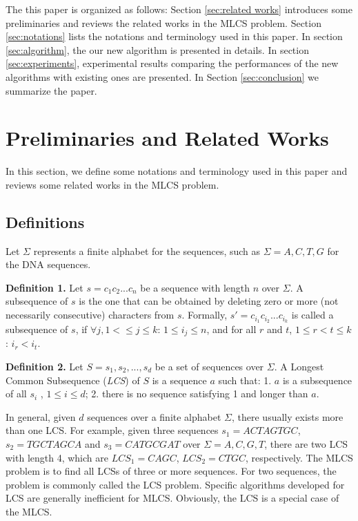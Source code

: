 \documentclass{article}
\begin{document}
The this paper is organized as follows: Section \ref{sec:related
  works} introduces some preliminaries and reviews the related works
in the MLCS problem. Section \ref{sec:notations} lists the notations
and terminology used in this paper. In section \ref{sec:algorithm},
the our new algorithm is presented in details. In section
\ref{sec:experiments}, experimental results comparing the performances
of the new algorithms with existing ones are presented. In Section
\ref{sec:conclusion} we summarize the paper.

\section{Preliminaries and Related Works}
\label{sec:related works}

In this section, we define some notations and terminology used in this
paper and reviews some related works in the MLCS problem.

\subsection{Definitions}
\label{sec:definitions}

Let $\Sigma$ represents a finite alphabet for the sequences, such as
$\Sigma={A, C, T, G}$ for the DNA sequences.

\textbf{Definition 1.} Let $s=c_1c_2...c_n$ be a sequence with length
$n$ over $\Sigma$. A subsequence of $s$ is the one that can be
obtained by deleting zero or more (not necessarily consecutive)
characters from $s$. Formally, $s'=c_{i_1}c_{i_2}...c_{i_k}$ is called
a subsequence of $s$, if $\forall j, 1< \leq j \leq k$:
$1 \leq i_j \leq n$, and for all $r$ and $t$, $1 \leq r < t \leq k$:
$i_r < i_t$.

\textbf{Definition 2.} Let $S={s_1, s_2, ..., s_d}$ be a set of
sequences over $\Sigma$. A Longest Common Subsequence (\emph{LCS}) of
$S$ is a sequence $a$ such that: 1. $a$ is a subsequence of all $s_i$
, $1 \leq i \leq d$; 2. there is no sequence satisfying 1 and longer
than $a$.

In general, given $d$ sequences over a finite alphabet $\Sigma$, there
usually exists more than one LCS. For example, given three sequences
$s_1 = ACTAGTGC$, $s_2 = TGCTAGCA$ and $s_3 = CATGCGAT$ over
$\Sigma = {A, C, G, T}$, there are two LCS with length 4, which are
$LCS_1 = CAGC$, $LCS_2 = CTGC$, respectively. The MLCS problem is to
find all LCSs of three or more sequences. For two sequences, the
problem is commonly called the LCS problem. Specific algorithms
developed for LCS are generally inefficient for MLCS. Obviously, the
LCS is a special case of the MLCS.
\end{document}
